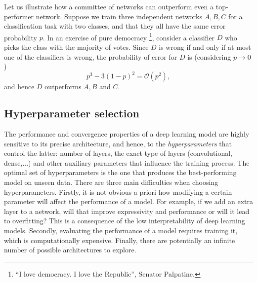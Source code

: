 Let us illustrate how a committee of networks can outperform even a top-performer network. Suppose we train three independent networks $A, B, C$ for a classification task with two classes, and that they all have the same error probability $p$. In an exercise of pure democracy \footnote{“I love democracy. I love the Republic”, Senator Palpatine.}, consider a classifier $D$ who picks the class with the majority of votes. Since $D$ is wrong if and only if at most one of the classifiers is wrong, the probability of error for $D$ is (considering $p\to 0$)
$$p^3-3(1-p)^2 =\mathcal{O}(p^2),$$
and hence $D$ outperforms $A,B$ and $C$.


\subsection{Hyperparameter selection}\label{sec:optuna}
The performance and convergence properties of a deep learning model are highly sensitive to its precise architecture, and hence, to the \emph{hyperparameters} that control the latter: number of layers, the exact type of layers (convolutional, dense,...) and other auxiliary parameters that influence the training process. The optimal set of hyperparameters is the one that produces the best-performing model on unseen data. There are three main difficulties when choosing hyperparameters. Firstly, it is not obvious a priori how modifying a certain parameter will affect the performance of a model. For example, if we add an extra layer to a network, will that improve expressivity and performance or will it lead to overfitting? This is a consequence of the low interpretability of deep learning models. Secondly, evaluating the performance of a model requires training it, which is computationally expensive. Finally, there are potentially an infinite number of possible architectures to explore.

